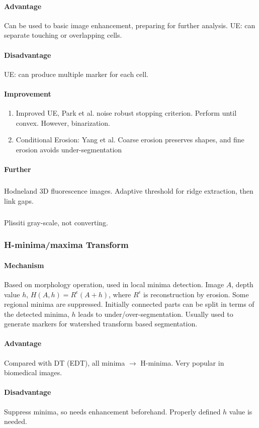\documentclass[10pt,a4paper]{article}
\begin{document}
\paragraph{Advantage}Can be used to basic image enhancement, preparing for further analysis. UE: can separate touching or overlapping cells.
\paragraph{Disadvantage}UE: can produce multiple marker for each cell.
\paragraph{Improvement}
\begin{enumerate}
	\item Improved UE, Park et al. noise robust stopping criterion. Perform until convex. However, binarization.
	\item Conditional Erosion: Yang et al. Coarse erosion preserves shapes, and fine erosion avoids under-segmentation
\end{enumerate}
\paragraph{Further}
\subparagraph{}Hodneland 3D fluorescence images. Adaptive threshold for ridge extraction, then link gaps.
\subparagraph{}Plissiti gray-scale, not converting.

\subsubsection{H-minima/maxima Transform}
\paragraph{Mechanism}
Based on morphology operation, used in local minima detection. Image $A$, depth value $h$, $H(A,h)=R^{\epsilon}(A+h)$, where $R^{\epsilon}$ is reconstruction by erosion. Some regional minima are suppressed. Initially connected parts can be split in terms of the detected minima, $h$ leads to under/over-segmentation. Usually used to generate markers for watershed transform based segmentation.
\paragraph{Advantage}
Compared with DT (EDT), all minima $\to$ H-minima. Very popular in biomedical images.
\paragraph{Disadvantage}
Suppress minima, so needs enhancement beforehand. Properly defined $h$ value is needed.
\end{document}
